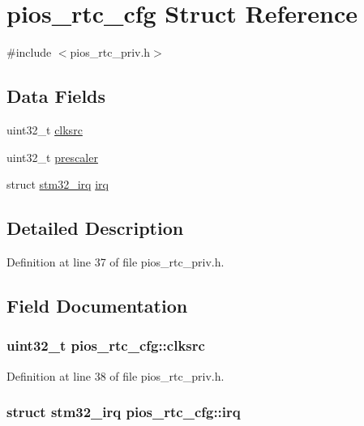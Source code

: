 \hypertarget{structpios__rtc__cfg}{\section{pios\-\_\-rtc\-\_\-cfg \-Struct \-Reference}
\label{structpios__rtc__cfg}
}


{\ttfamily \#include $<$pios\-\_\-rtc\-\_\-priv.\-h$>$}

\subsection*{\-Data \-Fields}
\begin{DoxyCompactItemize}
\item 
uint32\-\_\-t \hyperlink{structpios__rtc__cfg_a6ed1405edce6d0ed2251dc6936b4eec9}{clksrc}
\item 
uint32\-\_\-t \hyperlink{structpios__rtc__cfg_a9ba0d9532d31cd9ff861f59a2d2d7c98}{prescaler}
\item 
struct \hyperlink{structstm32__irq}{stm32\-\_\-irq} \hyperlink{structpios__rtc__cfg_aa3d36b543b26502f3063228fc2c69496}{irq}
\end{DoxyCompactItemize}


\subsection{\-Detailed \-Description}


\-Definition at line 37 of file pios\-\_\-rtc\-\_\-priv.\-h.



\subsection{\-Field \-Documentation}
\hypertarget{structpios__rtc__cfg_a6ed1405edce6d0ed2251dc6936b4eec9}{
\subsubsection[{clksrc}]{\setlength{\rightskip}{0pt plus 5cm}uint32\-\_\-t {\bf pios\-\_\-rtc\-\_\-cfg\-::clksrc}}}\label{structpios__rtc__cfg_a6ed1405edce6d0ed2251dc6936b4eec9}


\-Definition at line 38 of file pios\-\_\-rtc\-\_\-priv.\-h.

\hypertarget{structpios__rtc__cfg_aa3d36b543b26502f3063228fc2c69496}{
\subsubsection[{irq}]{\setlength{\rightskip}{0pt plus 5cm}struct {\bf stm32\-\_\-irq} {\bf pios\-\_\-rtc\-\_\-cfg\-::irq}}}\label{structpios__rtc__cfg_aa3d36b543b26502f3063228fc2c69496}


